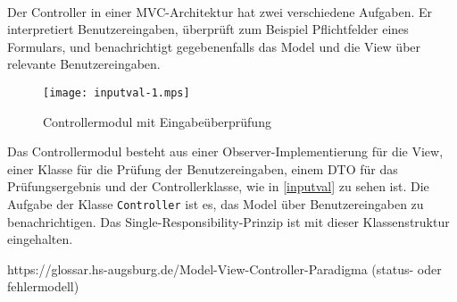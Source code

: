 \documentclass{article}
\begin{document}
\paragraph{}
Der Controller in einer MVC-Architektur hat zwei verschiedene Aufgaben. Er interpretiert Benutzereingaben, überprüft zum Beispiel Pflichtfelder eines Formulars, und benachrichtigt gegebenenfalls das Model und die View über relevante Benutzereingaben.

\begin{figure}[h]
  \centering
  \texttt{[image: inputval-1.mps]}
  \caption{Controllermodul mit Eingabeüberprüfung}
  \label{inputval}
\end{figure}

Das Controllermodul besteht aus einer Observer-Implementierung für die View, einer Klasse für die Prüfung der Benutzereingaben, einem DTO für das Prüfungsergebnis und der Controllerklasse, wie in \autoref{inputval} zu sehen ist. Die Aufgabe der Klasse \texttt{Controller} ist es, das Model über Benutzereingaben zu benachrichtigen. Das Single-Responsibility-Prinzip ist mit dieser Klassenstruktur eingehalten.


\pagebreak
\printbibliography[title=Literaturverzeichnis]
% 
%
%

https://glossar.hs-augsburg.de/Model-View-Controller-Paradigma (status- oder fehlermodell)

\newpage
{}
\printglossary[type=main, title=Glossar, style=list]
\end{document}
